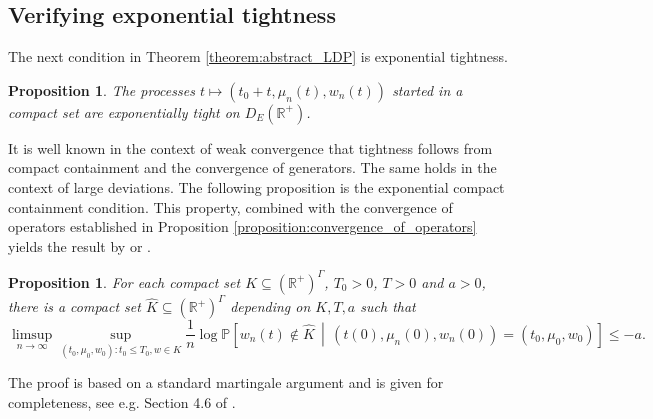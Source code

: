 \documentclass[a4paper]{article}
\newcommand{\bR}{\mathbb{R}}
\newcommand{\PR}{\mathbb{P}}
\numberwithin{equation}{section}
\newtheorem{proposition}[theorem]{Proposition}
\theoremstyle{definition}
\begin{document}
\subsection{Verifying exponential tightness}

The next condition in Theorem \ref{theorem:abstract_LDP}  is exponential tightness.

\begin{proposition} \label{proposition:exponential_tightness}
	The processes $t \mapsto (t_0 + t, \mu_n(t),w_n(t))$ started in a compact set are exponentially tight on $D_E(\bR^+)$.
\end{proposition}

It is well known in the context of weak convergence that tightness follows from compact containment and the convergence of generators. The same holds in the context of large deviations. The following proposition is the exponential compact containment condition. This property, combined with the convergence of operators established in Proposition \ref{proposition:convergence_of_operators} yields the result by \cite[Corollary 4.19]{FK06} or \cite[Proposition 7.12]{Kr19c}.

\begin{proposition} \label{proposition:compact_containment}
	For each compact set $K \subseteq (\bR^+)^\Gamma$, $T_0 >0$, $T > 0$ and $a > 0$, there is a compact set $\hat{K} \subseteq (\bR^+)^\Gamma$ depending on $K,T,a$ such that
	\begin{equation*}
		\limsup_{n \rightarrow \infty} \sup_{(t_0,\mu_0,w_0): t_0 \leq T_0, w \in K} \frac{1}{n} \log \PR\left[w_n(t) \notin \hat{K} \, \middle| \, (t(0), \mu_n(0),w_n(0)) = (t_0,\mu_0,w_0) \right] \leq -a.
	\end{equation*}
\end{proposition}

The proof is based on a standard martingale argument and is given for completeness, see e.g. Section 4.6 of \cite{FK06}.
\end{document}
